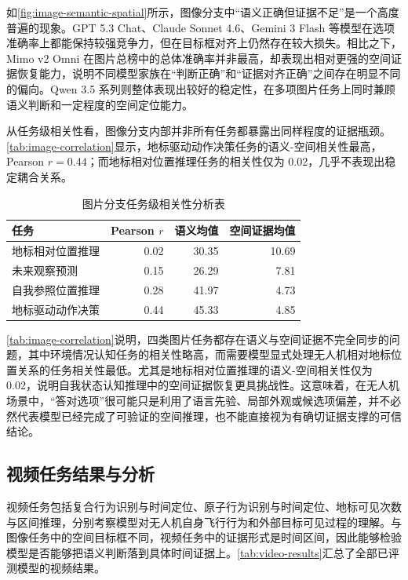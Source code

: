 如\autoref{fig:image-semantic-spatial}所示，图像分支中“语义正确但证据不足”是一个高度普遍的现象。GPT 5.3 Chat、Claude Sonnet 4.6、Gemini 3 Flash 等模型在选项准确率上都能保持较强竞争力，但在目标框对齐上仍然存在较大损失。相比之下，Mimo v2 Omni 在图片总榜中的总体准确率并非最高，却表现出相对更强的空间证据恢复能力，说明不同模型家族在“判断正确”和“证据对齐正确”之间存在明显不同的偏向。Qwen 3.5 系列则整体表现出较好的稳定性，在多项图片任务上同时兼顾语义判断和一定程度的空间定位能力。

从任务级相关性看，图像分支内部并非所有任务都暴露出同样程度的证据瓶颈。\autoref{tab:image-correlation}显示，地标驱动动作决策任务的语义-空间相关性最高，Pearson \(r=0.44\)；而地标相对位置推理任务的相关性仅为 0.02，几乎不表现出稳定耦合关系。

\begin{table}[htbp]
    \centering
    \caption{图片分支任务级相关性分析表}
    \label{tab:image-correlation}
    \begin{tabularx}{\textwidth}{Xrrr}
        \toprule
        任务 & Pearson \(r\) & 语义均值 & 空间证据均值 \\
        \midrule
        地标相对位置推理 & 0.02 & 30.35 & 10.69 \\
        未来观察预测 & 0.15 & 26.29 & 7.81 \\
        自我参照位置推理 & 0.28 & 41.97 & 4.73 \\
        地标驱动动作决策 & 0.44 & 45.33 & 4.85 \\
        \bottomrule
    \end{tabularx}
\end{table}

\autoref{tab:image-correlation}说明，四类图片任务都存在语义与空间证据不完全同步的问题，其中环境情况认知任务的相关性略高，而需要模型显式处理无人机相对地标位置关系的任务相关性最低。尤其是地标相对位置推理的语义-空间相关性仅为 0.02，说明自我状态认知推理中的空间证据恢复更具挑战性。这意味着，在无人机场景中，“答对选项”很可能只是利用了语言先验、局部外观或候选项偏差，并不必然代表模型已经完成了可验证的空间推理，也不能直接视为有确切证据支撑的可信结论。

\FloatBarrier
\subsection{视频任务结果与分析}

视频任务包括复合行为识别与时间定位、原子行为识别与时间定位、地标可见次数与区间推理，分别考察模型对无人机自身飞行行为和外部目标可见过程的理解。与图像任务中的空间目标框不同，视频任务中的证据形式是时间区间，因此能够检验模型是否能够把语义判断落到具体时间证据上。\autoref{tab:video-results}汇总了全部已评测模型的视频结果。

